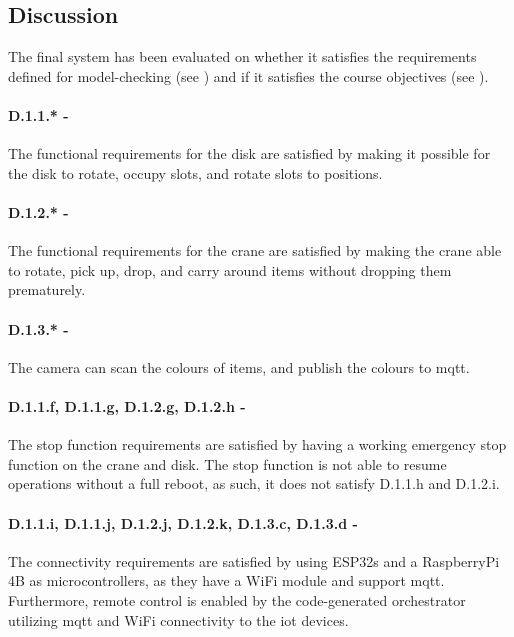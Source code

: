 \subsection{Discussion}

The final system has been evaluated on whether it satisfies the requirements defined for model-checking (see ) and if it satisfies the course objectives (see ).

\paragraph{D.1.1.* -} The functional requirements for the disk are satisfied by making it possible for the disk to rotate, occupy slots, and rotate slots to positions.

\paragraph{D.1.2.* -} The functional requirements for the crane are satisfied by making the crane able to rotate, pick up, drop, and carry around items without dropping them prematurely.

\paragraph{D.1.3.* -} The camera can scan the colours of items, and publish the colours to \acrshort{mqtt}.

\paragraph{D.1.1.f, D.1.1.g, D.1.2.g, D.1.2.h -}
The stop function requirements are satisfied by having a working emergency stop function on the crane and disk. The stop function is not able to resume operations without a full reboot, as such, it does not satisfy D.1.1.h and D.1.2.i.

\paragraph{D.1.1.i, D.1.1.j, D.1.2.j, D.1.2.k, D.1.3.c, D.1.3.d -} The connectivity requirements are satisfied by using ESP32s and a RaspberryPi 4B as microcontrollers, as they have a WiFi module and support \acrshort{mqtt}. Furthermore, remote control is enabled by the code-generated orchestrator utilizing \acrshort{mqtt} and WiFi connectivity to the \acrshort{iot} devices. 

